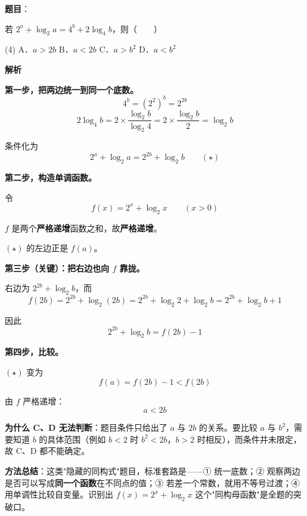 \begin{answer}

\textbf{题目}：

若 $2^{a}+\log_2 a=4^{b}+2\log_4 b$，则\mbox{（　　）}

\begin{gkopts}(4)
\task A．$a>2b$
\task B．$a<2b$
\task C．$a>b^{2}$
\task D．$a<b^{2}$
\end{gkopts}

\textbf{解析}

\textbf{第一步，把两边统一到同一个底数。}
\nopagebreak[4]
\[4^{b}=\left(2^{2}\right)^{b}=2^{2b}\]
\nopagebreak[4]
\[2\log_4 b=2\times\frac{\log_2 b}{\log_2 4}=2\times\frac{\log_2 b}2=\log_2 b\]

条件化为
\nopagebreak[4]
\[2^{a}+\log_2 a=2^{2b}+\log_2 b\qquad(\star)\]

\textbf{第二步，构造单调函数。}

令
\nopagebreak[4]
\[f(x)=2^{x}+\log_2 x\qquad(x>0)\]

$f$ 是两个\textbf{严格递增}函数之和，故\textbf{严格递增}。

$(\star)$ 的左边正是 $f(a)$。

\textbf{第三步（关键）：把右边也向 $f$ 靠拢。}

右边为 $2^{2b}+\log_2 b$，而
\nopagebreak[4]
\[f(2b)=2^{2b}+\log_2(2b)=2^{2b}+\log_2 2+\log_2 b=2^{2b}+\log_2 b+1\]

因此
\nopagebreak[4]
\[2^{2b}+\log_2 b=f(2b)-1\]

\textbf{第四步，比较。}

$(\star)$ 变为
\nopagebreak[4]
\[f(a)=f(2b)-1<f(2b)\]

由 $f$ 严格递增：
\nopagebreak[4]
\[a<2b\]

\begin{gktip}
\textbf{为什么 C、D 无法判断}：题目条件只给出了 $a$ 与 $2b$ 的关系。要比较 $a$ 与 $b^{2}$，需要知道 $b$ 的具体范围（例如 $b<2$ 时 $b^2<2b$，$b>2$ 时相反），而条件并未限定，故 C、D 都不能确定。

\textbf{方法总结}：这类"隐藏的同构式"题目，标准套路是——① 统一底数；② 观察两边是否可以写成\textbf{同一个函数}在不同点的值；③ 若差一个常数，就用不等号过渡；④ 用单调性比较自变量。识别出 $f(x)=2^{x}+\log_2 x$ 这个"同构母函数"是全题的突破口。
\end{gktip}


\par\medskip

\end{answer}

